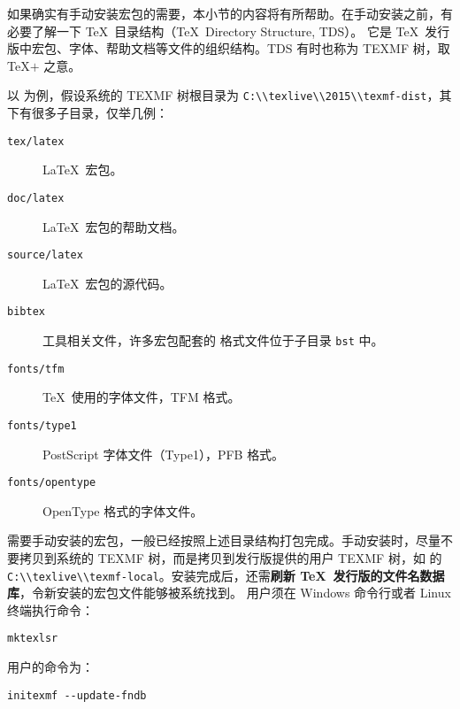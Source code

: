 如果确实有手动安装宏包的需要，本小节的内容将有所帮助。在手动安装之前，有必要了解一下 \TeX\ 目录结构（\TeX\ Directory Structure, TDS）。
它是 \TeX\ 发行版中宏包、字体、帮助文档等文件的组织结构。TDS 有时也称为 TEXMF 树，取 \TeX$+$ 之意。

以  为例，假设系统的 TEXMF 树根目录为 \nolinkurl{C:\\texlive\\2015\\texmf-dist}，其下有很多子目录，仅举几例：
\begin{description}
  \item[\texttt{tex/latex}] \LaTeX\ 宏包。
  \item[\texttt{doc/latex}] \LaTeX\ 宏包的帮助文档。
  \item[\texttt{source/latex}] \LaTeX\ 宏包的源代码。
  \item[\texttt{bibtex}]  工具相关文件，许多宏包配套的  格式文件位于子目录 \texttt{bst} 中。
  \item[\texttt{fonts/tfm}] \TeX\ 使用的字体文件，TFM 格式。
  \item[\texttt{fonts/type1}] PostScript 字体文件（Type1），PFB 格式。
  \item[\texttt{fonts/opentype}] OpenType 格式的字体文件。
\end{description}

需要手动安装的宏包，一般已经按照上述目录结构打包完成。手动安装时，尽量不要拷贝到系统的 TEXMF 树，而是拷贝到发行版提供的用户 TEXMF 树，如
 的 \nolinkurl{C:\\texlive\\texmf-local}。安装完成后，还需\textbf{刷新 \TeX\ 发行版的文件名数据库}，令新安装的宏包文件能够被系统找到。
 用户须在 Windows 命令行或者 Linux 终端执行命令：
\begin{verbatim}
mktexlsr
\end{verbatim}
 用户的命令为：
\begin{verbatim}
initexmf --update-fndb
\end{verbatim}

\endinput
